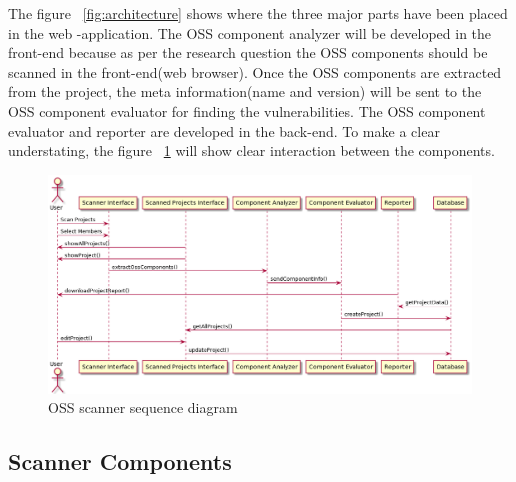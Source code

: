 \newpage
The figure ~\ref{fig:architecture} shows where the three major parts have been placed in the web -application. The \acs{OSS} component analyzer will be developed in the front-end because as per the research question the \acs{OSS} components should be scanned in the front-end(web browser). Once the \acs{OSS} components are extracted from the project, the meta information(name and version) will be sent to the \acs{OSS} component evaluator for finding the vulnerabilities. The OSS component evaluator and reporter are developed in the back-end. To make a clear understating, the figure ~\ref{fig:sequence} will show clear interaction between the components.
\begin{figure}[h!]
	\includegraphics[width=15cm]{includes/sequence_diagram.png}
	\centering
	\caption{\acs{OSS} scanner sequence diagram}
	\label{fig:sequence}
\end{figure} 
\subsection{Scanner Components}

